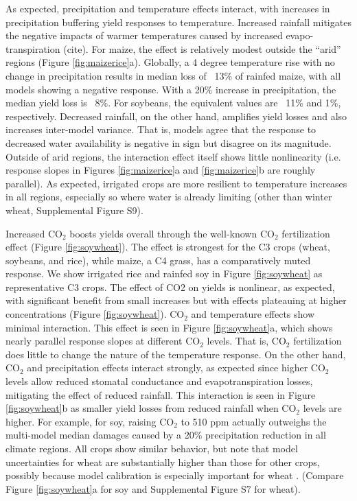 \documentclass[gmd, manuscript]{copernicus} %
\begin{document}
As expected, precipitation and temperature effects interact, with increases in precipitation buffering yield responses to temperature. 
Increased rainfall mitigates the negative impacts of warmer temperatures caused by increased evapo-transpiration (cite). 
For maize, the effect is relatively modest outside the ``arid'' regions (Figure \ref{fig:maizerice}a). 
Globally, a 4 degree temperature rise with no change in precipitation results in median loss of ~13\% of rainfed maize, with all models showing a negative response.
With a 20\% increase in precipitation, the median yield loss is ~8\%. 
For soybeans, the equivalent values are ~11\% and 1\%, respectively. 
Decreased rainfall, on the other hand, amplifies yield losses and also increases inter-model variance. 
That is, models agree that the response to decreased water availability is negative in sign but disagree on its magnitude. 
Outside of arid regions, the interaction effect itself shows little nonlinearity (i.e. response slopes in Figures \ref{fig:maizerice}a and \ref{fig:maizerice}b are roughly parallel). 
As expected, irrigated crops are more resilient to temperature increases in all regions, especially so where water is already limiting  (other than winter wheat, Supplemental Figure S9).

Increased CO$_2$ boosts yields overall through the well-known CO$_2$ fertilization effect (Figure \ref{fig:soywheat}). 
The effect is strongest for the C3 crops (wheat, soybeans, and rice), while maize, a C4 grass, has a comparatively muted response. 
We show irrigated rice and rainfed soy in Figure \ref{fig:soywheat} as representative C3 crops.  
The effect of CO2 on yields is nonlinear, as expected, with significant benefit from small increases but with effects plateauing at higher concentrations (Figure \ref{fig:soywheat}). 
CO$_2$ and temperature effects show minimal interaction. 
This effect is seen in Figure \ref{fig:soywheat}a, which shows nearly parallel response slopes at different CO$_2$ levels. 
That is, CO$_2$ fertilization does little to change the nature of the temperature response. 
On the other hand, CO$_2$ and precipitation effects interact strongly, as expected since higher CO$_2$ levels allow reduced stomatal conductance and evapotranspiration losses, mitigating the effect of reduced rainfall. 
This interaction is seen in Figure \ref{fig:soywheat}b as smaller yield losses from reduced rainfall when CO$_2$ levels are higher. 
For example, for soy, raising CO$_2$ to 510 ppm actually outweighs the multi-model median damages caused by a 20\% precipitation reduction in all climate regions. 
All crops show similar behavior, but note that model uncertainties for wheat are substantially higher than those for other crops, possibly because model calibration is especially important for wheat \citep{Asseng2013}. 
(Compare Figure \ref{fig:soywheat}a for soy and Supplemental Figure S7 for wheat).
\end{document}
